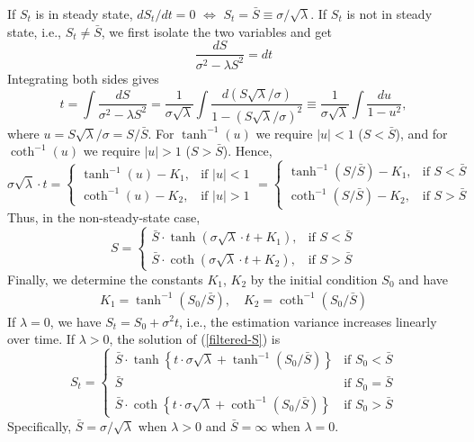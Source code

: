 \documentclass[mnsc]{informs3}
\begin{document}
\begin{APPENDICES}
If $S_t$ is in steady state, $dS_t/dt = 0$ $\Leftrightarrow$ $S_t = \bar{S} \equiv \sigma/\sqrt{\lambda}$.
If $S_t$ is not in steady state, i.e., $S_t\neq\bar{S}$, we first isolate the two variables and get
\begin{equation*}
	\frac{dS}{\sigma^2-\lambda S^2} = dt
\end{equation*}
Integrating both sides gives
\begin{equation*}
    t = \int \frac{dS}{\sigma^2-\lambda S^2}
    = \frac{1}{\sigma\sqrt{\lambda}}
    \int \frac{d(S\sqrt{\lambda}/\sigma)}{1-(S\sqrt{\lambda}/\sigma)^2}
    \equiv \frac{1}{\sigma\sqrt{\lambda}}\int \frac{du}{1-u^2},
\end{equation*}
where $u = S\sqrt{\lambda}/\sigma = S/\bar{S}$.
For $\tanh^{-1}(u)$ we require $|u|<1$ ($S<\bar S$), and for $\coth^{-1}(u)$ we require $|u|>1$ ($S>\bar S$).
Hence,
\begin{equation*}
    \sigma\sqrt{\lambda}\cdot t = \begin{cases}
        \tanh^{-1}(u)-K_1, & \text{if } |u|<1\\
        \coth^{-1}(u)-K_2, & \text{if } |u|>1
    \end{cases} = \begin{cases}
        \tanh^{-1}(S/\bar{S})-K_1, & \text{if } S<\bar{S}\\
        \coth^{-1}(S/\bar{S})-K_2, & \text{if } S>\bar{S}
\end{cases}
\end{equation*}
Thus, in the non-steady-state case,
\begin{equation*}
	S = \begin{cases}
		\bar{S}\cdot\tanh(\sigma\sqrt{\lambda}\cdot t + K_1), & \text{if } S<\bar{S}\\
		\bar{S}\cdot\coth(\sigma\sqrt{\lambda}\cdot t + K_2), & \text{if } S>\bar{S}
	\end{cases}
\end{equation*}
Finally, we determine the constants $K_1$, $K_2$ by the initial condition $S_0$ and have
\begin{align*}
	K_1 = \tanh^{-1}(S_0/\bar{S}),\quad
	K_2 = \coth^{-1}(S_0/\bar{S})
\end{align*}
If $\lambda = 0$, we have $S_t = S_0+\sigma^2t$, i.e., the estimation variance increases linearly over time.
If $\lambda > 0$, the solution of (\ref{filtered-S}) is
\begin{equation*}
	S_t =
	\begin{cases}
        \bar{S} \cdot \tanh\left\{t\cdot\sigma\sqrt{\lambda} +  \tanh^{-1}\left(S_0\big/\bar{S}\right)\right\} & \text{if } S_0 < \bar{S} \\
        \bar{S} & \text{if } S_0 = \bar{S} \\
        \bar{S} \cdot \coth\left\{t\cdot\sigma\sqrt{\lambda} +  \coth^{-1}\left(S_0\big/\bar{S}\right)\right\} & \text{if } S_0 > \bar{S}
	\end{cases}
\end{equation*}
Specifically, $\bar{S} = \sigma / \sqrt{\lambda}$ when $\lambda>0$ and $\bar{S} = \infty$ when $\lambda = 0$.



\end{APPENDICES}
\end{document}
